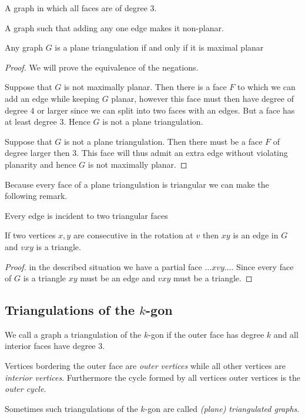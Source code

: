 \begin{defi} 
A graph in which all faces are of degree $3$.
\end{defi}

\begin{defi} 
A graph such that adding any one edge makes it non-planar.
\end{defi}

\begin{thrm}
Any graph $G$ is a plane triangulation if and only if it is maximal planar
\end{thrm}

\begin{proof}
We will prove the equivalence of the negations.

Suppose that $G$ is not maximally planar. Then there is a face $F$ to which we can add an edge while keeping $G$ planar, however this face must then have degree of degree $4$ or larger since we can split into two faces with an edges. But a face has at least degree 3. Hence $G$ is not a plane triangulation.

Suppose that $G$ is not a plane triangulation. Then there must be a face $F$ of degree larger then $3$. This face will thus admit an extra edge without violating planarity and hence $G$ is not maximally planar.
\end{proof}

Because every face of a plane triangulation is triangular we can make the following remark.

\begin{remark}
  Every edge is incident to two triangular faces
\end{remark}

\begin{lemma}
  \label{lm:prelim:rotationEdge}
  If two vertices $x, y$ are consecutive in the rotation at $v$ then $xy$ is an edge in $G$ and $vxy$ is a triangle.
\end{lemma}
\begin{proof}
  in the described situation we have a partial face $\ldots x v y \ldots$.  Since every face of $G$ is a triangle $xy$ must be an edge and $vxy$ must be a triangle.
\end{proof}

\subsection{Triangulations of the $k$-gon}

\begin{defi}
We call a graph a triangulation of the $k$-gon if the outer face has degree $k$ and all interior faces have degree $3$.
\end{defi}
Vertices bordering the outer face are \emph{outer vertices} while all other vertices are \emph{interior vertices}. Furthermore the cycle formed by all vertices outer vertices is the \emph{outer cycle}.

Sometimes such triangulations of the $k$-gon are called \emph{(plane) triangulated graphs}.
